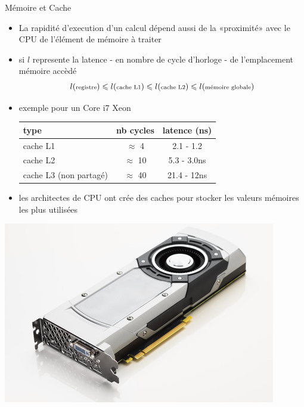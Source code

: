 \documentclass[11pt,mathserif]{beamer}
\begin{document}
\begin{frame}{Mémoire et Cache}
\begin{itemize}[<+->]
  \item La rapidité d'execution d'un calcul dépend aussi de la «proximité» avec le CPU de l'élément de mémoire à traiter 
  \item si $l$ represente la latence - en nombre de cycle d'horloge - de l'emplacement mémoire accèdé
  $$l({\mbox{\scriptsize registre}}) \leqslant l(\mbox{\scriptsize cache L1}) \leqslant
    l(\mbox{\scriptsize cache L2}) \leqslant l(\mbox{\scriptsize mémoire globale})$$
  \item exemple pour un Core i7 Xeon
    \begin{tabular}{|l|c|c|}
    \hline
      type & nb cycles & latence (ns)  \\
    \hline
      cache L1  & $\approx$ 4 & 2.1 - 1.2 \\
      cache L2  & $\approx$ 10 & 5.3 - 3.0ns \\
      cache L3 (non partagé)  & $\approx$ 40 & 21.4 - 12ns \\
    \hline
    \end{tabular}

  \item les architectes de CPU ont crée des caches pour stocker les valeurs mémoires les plus utilisées
\end{itemize}
\begin{center}
\includegraphics[width=0.5\linewidth]{gpu.jpg}
\end{center}
\end{frame}
\end{document}
